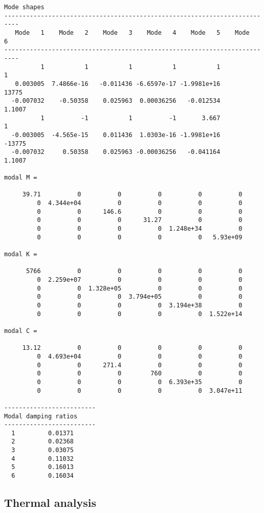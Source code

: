 \begin{screen}
\begin{verbatim}
Mode shapes
--------------------------------------------------------------------------
   Mode   1    Mode   2    Mode   3    Mode   4    Mode   5    Mode   6    
--------------------------------------------------------------------------
          1           1           1           1           1           1 
   0.003005  7.4866e-16   -0.011436 -6.6597e-17 -1.9981e+16       13775 
  -0.007032    -0.50358    0.025963  0.00036256   -0.012534      1.1007 
          1          -1           1          -1       3.667           1 
  -0.003005  -4.565e-15    0.011436  1.0303e-16 -1.9981e+16      -13775 
  -0.007032     0.50358    0.025963 -0.00036256   -0.041164      1.1007 

modal M = 

     39.71          0          0          0          0          0 
         0  4.344e+04          0          0          0          0 
         0          0      146.6          0          0          0 
         0          0          0      31.27          0          0 
         0          0          0          0  1.248e+34          0 
         0          0          0          0          0   5.93e+09 

modal K = 

      5766          0          0          0          0          0 
         0  2.259e+07          0          0          0          0 
         0          0  1.328e+05          0          0          0 
         0          0          0  3.794e+05          0          0 
         0          0          0          0  3.194e+38          0 
         0          0          0          0          0  1.522e+14 

modal C = 

     13.12          0          0          0          0          0 
         0  4.693e+04          0          0          0          0 
         0          0      271.4          0          0          0 
         0          0          0        760          0          0 
         0          0          0          0  6.393e+35          0 
         0          0          0          0          0  3.047e+11 

-------------------------
Modal damping ratios
-------------------------
  1         0.01371
  2         0.02368
  3         0.03075
  4         0.11032
  5         0.16013
  6         0.16034
 \end{verbatim}
\end{screen}

\subsection{Thermal analysis}

